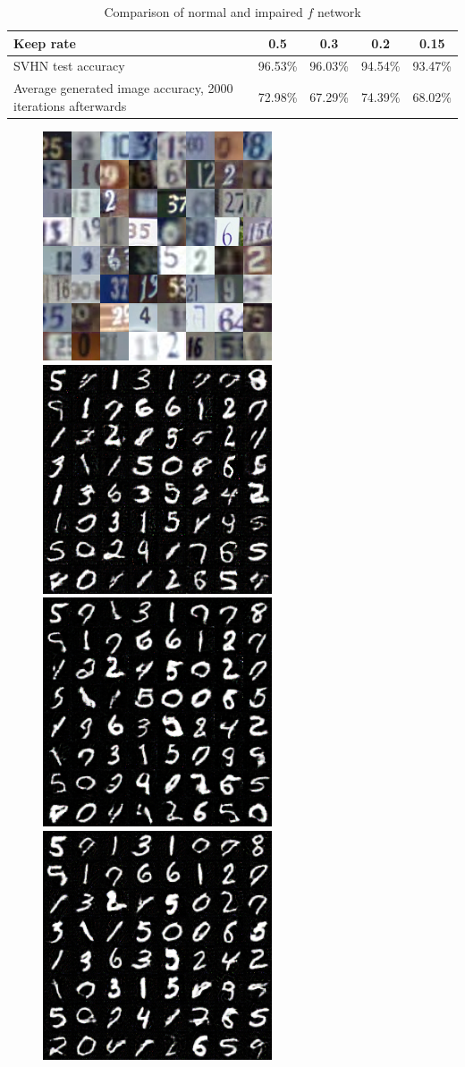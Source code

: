\documentclass{article}
\begin{document}
\begin{table}[H]
	\centering
	\caption{Comparison of normal and impaired $f$ network}
	\begin{tabular}{|l|c|c|c|c|}
	    \hline
		Keep rate & 0.5 & 0.3 & 0.2 & 0.15 \\ \hline \hline
		SVHN test accuracy & 96.53\% & 96.03\% &  94.54\% & 93.47\% \\ \hline
		Average generated image accuracy, 2000 iterations afterwards & 72.98\% & 67.29\% & 74.39\% & 68.02\% \\ \hline
	\end{tabular}
\end{table}

\begin{figure}[H]
	\centering
	\includegraphics[width = 5 cm]{img/1000_0000_src.png}
	\\
	\includegraphics[width = 5 cm]{img/4000_0000_gen.png}
	\includegraphics[width = 5 cm]{img/4000_0000_gen_D030.png}
	\includegraphics[width = 5 cm]{img/4000_0000_gen_D020.png}

\end{figure}
\end{document}
